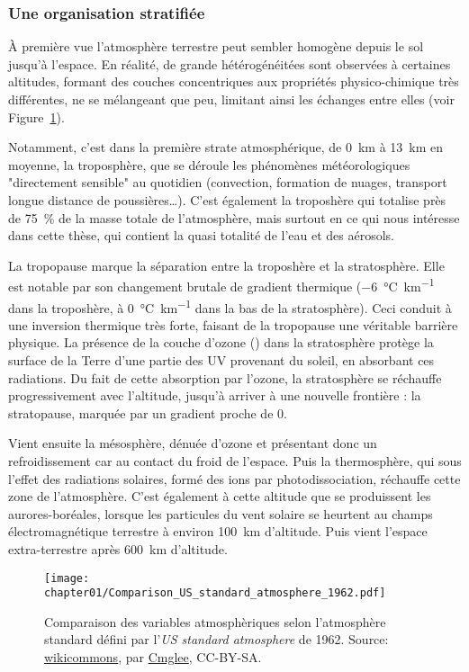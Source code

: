 \subsubsection{Une organisation stratifiée}%
\label{ssub:une_organisation_stratifiée}

À première vue l'atmosphère terrestre peut sembler homogène depuis le sol jusqu'à
l'espace. En réalité, de grande hétérogénéitées sont observées à certaines altitudes,
formant des couches concentriques aux propriétés physico-chimique très différentes, ne se
mélangeant que peu, limitant ainsi les échanges entre elles (voir
Figure~\ref{fig:chapter01/Comparison_US_standard_atmosphere_1962}).

Notamment, c'est dans la première strate atmosphérique, de \SI{0}{km} à \SI{13}{km} en
moyenne, la troposphère, que se déroule les phénomènes météorologiques
"directement sensible" au quotidien
(convection, formation de nuages, transport longue distance de poussières…).
C'est également la troposhère qui totalise près de \SI{75}{\percent} de la masse totale
de l'atmosphère, mais surtout en ce qui nous intéresse dans cette thèse, qui contient la
quasi totalité de l'eau et des aérosols.

La tropopause marque la séparation entre la troposhère et la stratosphère. Elle est
notable par son changement brutale de gradient thermique (\SI{-6}{\degreeCelsius\per\km}
dans la troposhère, à \SI{0}{\degreeCelsius\per\km} dans la bas de la stratosphère).
Ceci conduit à une inversion thermique très forte, faisant de la tropopause une véritable
barrière physique. La présence de la couche d'ozone () dans la stratosphère
protège la surface de la Terre d'une partie des UV provenant du soleil, en absorbant ces
radiations. Du fait de cette absorption par l'ozone, la stratosphère se réchauffe
progressivement avec l'altitude, jusqu'à arriver à une nouvelle frontière : la
stratopause, marquée par un gradient proche de 0.

Vient ensuite la mésosphère, dénuée d'ozone et présentant donc un refroidissement car au
contact du froid de l'espace. Puis la thermosphère, qui sous l'effet des radiations
solaires, formé des ions par photodissociation, réchauffe cette zone de l'atmosphère.
C'est également à cette altitude que se produissent les aurores-boréales, lorsque les
particules du vent solaire se heurtent au champs électromagnétique terrestre à environ
\SI{100}{km} d'altitude. Puis vient l'espace extra-terrestre après \SI{600}{km}
d'altitude.

\begin{figure}[ht]
    \centering
    \texttt{[image: chapter01/Comparison\_US\_standard\_atmosphere\_1962.pdf]}
    \caption{%
        Comparaison des variables atmosphèriques selon l'atmosphère standard défini par
        l'\textit{US standard atmosphere} de 1962.
        Source:
        \href{https://commons.wikimedia.org/wiki/File:Comparison_US_standard_atmosphere_1962.svg}{wikicommons},
        par \href{https://commons.wikimedia.org/wiki/User:Cmglee}{Cmglee}, CC-BY-SA.
    }%
    \label{fig:chapter01/Comparison_US_standard_atmosphere_1962}
\end{figure}

